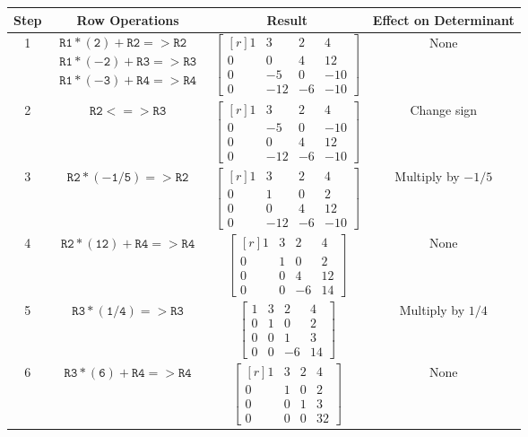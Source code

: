 \documentclass[12pt]{article}
\begin{document}
\begin{center}
\begin{tabular}{|c|c|c|c|}\hline
Step & Row Operations & Result & Effect on Determinant\\\hline
1 &
$\begin{matrix}\mathtt{R1*(2)+R2=>R2}\\\mathtt{R1*(-2)+R3=>R3}\\\mathtt{R1*(-3)+R4=>R4}\end{matrix}$ &
$\left[\begin{matrix*}[r]1 & 3 & 2 & 4\\0 & 0 & 4 & 12\\0 & -5 & 0 & -10\\0 & -12 & -6 & -10\end{matrix*}\right]$ &
None\\\hline
2 &
$\mathtt{R2<=>R3}$ &
$\left[\begin{matrix*}[r]1 & 3 & 2 & 4\\0 & -5 & 0 & -10\\0 & 0 & 4 & 12\\0 & -12 & -6 & -10\end{matrix*}\right]$ &
Change sign\\\hline
3 &
$\mathtt{R2*(-1/5)=>R2}$ &
$\left[\begin{matrix*}[r]1 & 3 & 2 & 4\\0 & 1 & 0 & 2\\0 & 0 & 4 & 12\\0 & -12 & -6 & -10\end{matrix*}\right]$ &
Multiply by $-1/5$\\\hline
4 &
$\mathtt{R2*(12)+R4=>R4}$ &
$\left[\begin{matrix*}[r]1 & 3 & 2 & 4\\0 & 1 & 0 & 2\\0 & 0 & 4 & 12\\0 & 0 & -6 & 14\end{matrix*}\right]$ &None\\\hline
5 &
$\mathtt{R3*(1/4)=>R3}$ &
$\left[\begin{matrix*}1 & 3 & 2 & 4\\0 & 1 & 0 & 2\\0 & 0 & 1 & 3\\0 & 0 & -6 & 14\end{matrix*}\right]$ &
Multiply by $1/4$\\\hline
6 &
$\mathtt{R3*(6)+R4=>R4}$ &
$\left[\begin{matrix*}[r]1 & 3 & 2 & 4\\0 & 1 & 0 & 2\\0 & 0 & 1 & 3\\0 & 0 & 0 & 32\end{matrix*}\right] $&
None\\\hline
\end{tabular}
\end{center}
\end{document}
